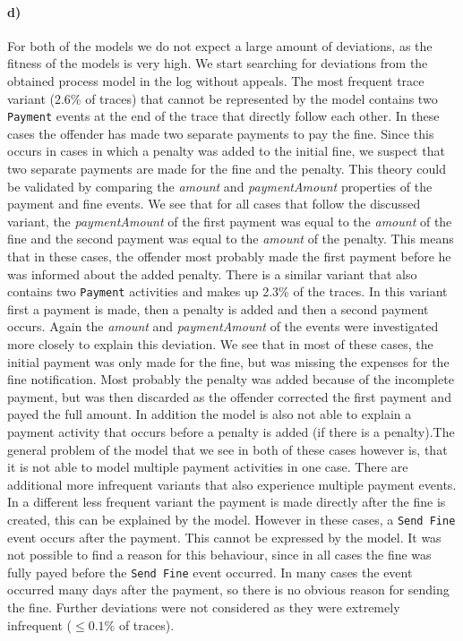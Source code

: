 \documentclass[12pt]{report}
\begin{document}
\paragraph{\textbf{d)}}

For both of the models we do not expect a large amount of deviations, as the fitness of the models is very high. We start searching for deviations from the obtained process model in the log without appeals. The most frequent trace variant (2.6\% of traces) that cannot be represented by the model contains two \texttt{Payment} events at the end of the trace that directly follow each other. In these cases the offender has made two separate payments to pay the fine. Since this occurs in cases in which a penalty was added to the initial fine, we suspect that two separate payments are made for the fine and the penalty. This theory could be validated by comparing the \emph{amount} and \emph{paymentAmount} properties of the payment and fine events. We see that for all cases that follow the discussed variant, the \emph{paymentAmount} of the first payment was equal to the \emph{amount} of the fine and the second payment was equal to the \emph{amount} of the penalty. This means that in these cases, the offender most probably made the first payment before he was informed about the added penalty. 
There is a similar variant that also contains two \texttt{Payment} activities and makes up 2.3\% of the traces. In this variant first a payment is made, then a penalty is added and then a second payment occurs. Again the \emph{amount} and \emph{paymentAmount} of the events were investigated more closely to explain this deviation. We see that in most of these cases, the initial payment was only made for the fine, but was missing the expenses for the fine notification. Most probably the penalty was added because of the incomplete payment, but was then discarded as the offender corrected the first payment and payed the full amount. In addition the model is also not able to explain a payment activity that occurs before a penalty is added (if there is a penalty).The general problem of the model that we see in both of these cases however is, that it is not able to model multiple payment activities in one case. There are additional more infrequent variants that also experience multiple payment events.
In a different less frequent variant the payment is made directly after the fine is created, this can be explained by the model. However in these cases, a \texttt{Send Fine} event occurs after the payment. This cannot be expressed by the model. It was not possible to find a reason for this behaviour, since in all cases the fine was fully payed before the \texttt{Send Fine} event occurred. In many cases the event occurred many days after the payment, so there is no obvious reason for sending the fine.
Further deviations were not considered as they were extremely infrequent ($\leq 0.1\%$ of traces).
\end{document}

